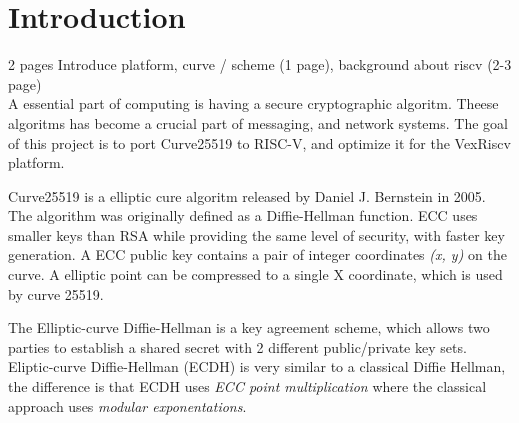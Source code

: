 \section{Introduction}
	 2 pages
    Introduce platform, curve / scheme (1 page), background about riscv (2-3 page)\\

    A essential part of computing is having a secure cryptographic algoritm. Theese algoritms has become a crucial part of messaging, and network systems.
    The goal of this project is to port Curve25519 to RISC-V, and optimize it for the VexRiscv platform.

    Curve25519 is a elliptic cure algoritm released by Daniel J. Bernstein in 2005. The algorithm was originally defined as a Diffie-Hellman function.
    ECC uses smaller keys than RSA while providing the same level of security, with faster key generation.
    A ECC public key contains a pair of integer coordinates \textit{(x, y)} on the curve. A elliptic point can be compressed to a single X coordinate, which is used by curve 25519.

    The Elliptic-curve Diffie-Hellman is a key agreement scheme, which allows two parties to establish a shared secret with 2 different public/private key sets. 
    Eliptic-curve Diffie-Hellman (ECDH) is very similar to a classical Diffie Hellman, the difference is that ECDH uses \textit{ECC point multiplication} where the classical approach uses \textit{modular exponentations}.
    